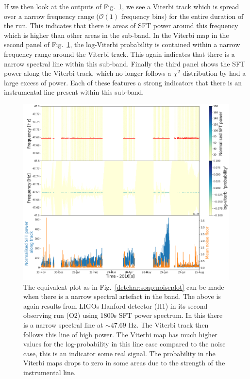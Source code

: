 %

If we then look at the outputs of Fig.~\ref{detchar:soap:lineplot}, we see a Viterbi track which is spread over a narrow frequency range ($\mathcal{O}(1)$ frequency bins) for the entire duration of the run.  
This indicates that there is areas of \gls{SFT} power around this frequency which is higher than other areas in the sub-band.
In the Viterbi map in the second panel of Fig.~\ref{detchar:soap:lineplot}, the log-Viterbi probability is contained within a narrow frequency range around the Viterbi track.
This again indicates that there is a narrow spectral line within this sub-band.
Finally the third panel shows the \gls{SFT} power along the Viterbi track, which no longer follows a $\chi^2$ distribution by had a large excess of power.
Each of these features a strong indicators that there is an instrumental line present within this sub-band.
%
\begin{figure}[hpt]
	\centering
	\includegraphics[width=\textwidth]{C6_detchar/track_F47_6_47_8_linenarrow.png}
	\caption[Example SOAP output for string narrow instrumental line.]{The equivalent plot as in Fig.~\ref{detchar:soap:noiseplot} can be made when there is a narrow spectral artefact in the band. The above is again results from \glspl{LIGO} Hanford detector (H1) in its second observing run (O2) using 1800s \gls{SFT} power spectrum. In this there is a narrow spectral line at $\sim 47.69$ Hz. The Viterbi track then follows this line of high power. The Viterbi map has much higher values for the log-probability in this line case compared to the noise case, this is an indicator some real signal. The probability in the Viterbi maps drops to zero in some areas due to the strength of the instrumental line. }
	\label{detchar:soap:lineplot}
\end{figure}
%


